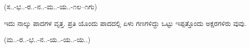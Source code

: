 \begin{kbvnote}
\hspace{0.5em}(ಸ..-ಭ..-ರ..-ನ..-ಮ..-ಯ..-೧ಲ--೧ಗು)
\end{kbvnote}

\vspace{4pt plus 4pt minus 1pt}\hspace{0.5em}ಇದು ನಾಲ್ಕು ಪಾದಗಳ ವೃತ್ತ. ಪ್ರತಿ ಯೊಂದು ಪಾದದಲ್ಲಿ ಏಳು ಗಣಗಳಿದ್ದು ಒಟ್ಟು ಇಪ್ಪತ್ತೊಂದು ಅಕ್ಷರಗಳಿರು ವುವು.\par

\begin{kbvnote}
\hspace{0.5em}(ಮ..-ರ..-ಭ..-ನ..-ಯ..-ಯ..-ಯ..)
\end{kbvnote}
